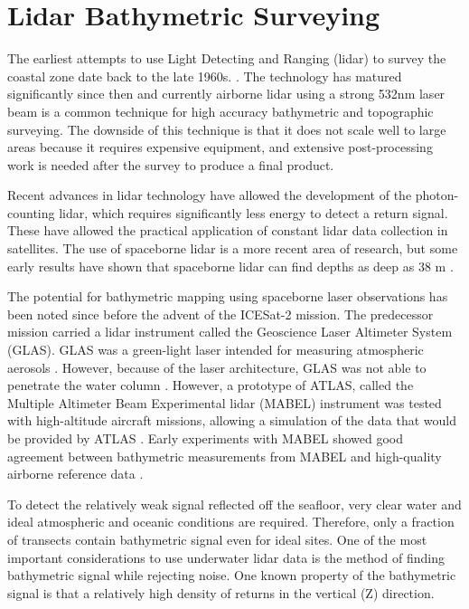 \section{Lidar Bathymetric Surveying}

The earliest attempts to use Light Detecting and Ranging (lidar) to survey the coastal zone date back to the late 1960s. \parencite{Bailly2016}. The technology has matured significantly since then and currently airborne lidar using a strong 532nm laser beam is a common technique for high accuracy bathymetric and topographic surveying. The downside of this technique is that it does not scale well to large areas because it requires expensive equipment, and extensive post-processing work is needed after the survey to produce a final product. 

Recent advances in lidar technology have allowed the development of the photon-counting lidar, which requires significantly less energy to detect a return signal. These have allowed the practical application of constant lidar data collection in satellites. The use of spaceborne lidar is a more recent area of research, but some early results have shown that spaceborne lidar can find depths as deep as 38 m \parencite{Parrish2019}.

The potential for bathymetric mapping using spaceborne laser observations has been noted since before the advent of the ICESat-2 mission. The predecessor mission carried a lidar instrument called the Geoscience Laser Altimeter System (GLAS). GLAS was a green-light laser intended for measuring atmospheric aerosols \parencite{Abshire2005}. However, because of the laser architecture, GLAS was not able to penetrate the water column \parencite{Forfinski-Sarkozi2016}. However, a prototype of ATLAS, called the Multiple Altimeter Beam Experimental lidar (MABEL) instrument was tested with high-altitude aircraft missions, allowing a simulation of the data that would be provided by ATLAS \parencite{Mcgill2013}. Early experiments with MABEL showed good agreement between bathymetric measurements from MABEL and high-quality airborne reference data \parencite{Jasinski2016,Forfinski-Sarkozi2016}.

To detect the relatively weak signal reflected off the seafloor, very clear water and ideal atmospheric and oceanic conditions are required. Therefore, only a fraction of transects contain bathymetric signal even for ideal sites. One of the most important considerations to use underwater lidar data is the method of finding bathymetric signal while rejecting noise. One known property of the bathymetric signal is that a relatively high density of returns in the vertical (Z) direction. 

